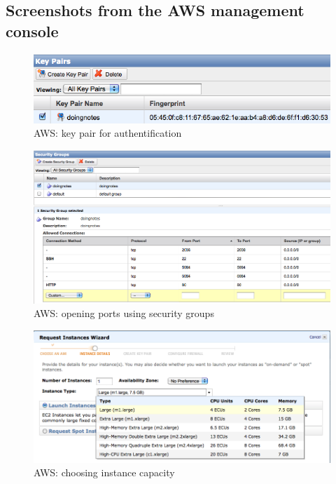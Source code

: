 \newpage
\subsection{Screenshots from the AWS management console}
\label{subsec:aws}

\begin{figure}[H] 
  \begin{center}
    \includegraphics[width=\textwidth]{grafik/aws-key-pair} 
  \end{center}
  \caption{AWS: key pair for authentification}
  \label{fig:aws-key}
\end{figure}

\begin{figure}[H] 
  \begin{center}
    \includegraphics[width=\textwidth]{grafik/aws-security-group} 
  \end{center}
  \caption{AWS: opening ports using security groups}
  \label{fig:aws-group}
\end{figure}

\begin{figure}[H] 
  \begin{center}
    \includegraphics[width=\textwidth]{grafik/aws-select-size} 
  \end{center}
  \caption{AWS: choosing instance capacity}
  \label{fig:aws-size}
\end{figure}

